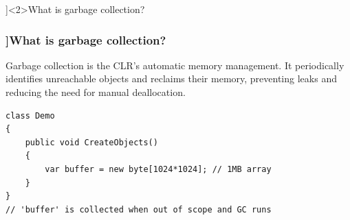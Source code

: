 \QuestionSlide[\CategoryBadge[MemoryColor!20]{Types \& Memory}]<2>{What is garbage collection?}
\begin{frame}[fragile]
  \frametitle{\AnswerTitle[\CategoryBadge[MemoryColor!20]{Types \& Memory}]{What is garbage collection?}}

  {\footnotesize
    Garbage collection is the CLR’s automatic memory management. It periodically identifies unreachable objects and reclaims their memory, preventing leaks and reducing the need for manual deallocation.
  }

  \begin{verbatim}
class Demo
{
    public void CreateObjects()
    {
        var buffer = new byte[1024*1024]; // 1MB array
    }
}
// 'buffer' is collected when out of scope and GC runs
  \end{verbatim}
\end{frame}
